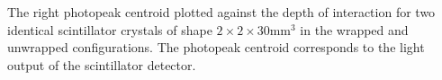 \label{fig:lightoutput} The right photopeak centroid plotted against the depth of interaction for two identical scintillator crystals of shape $2\times2\times30$mm$^3$ in the wrapped and unwrapped configurations. The photopeak centroid corresponds to the light output of the scintillator detector.